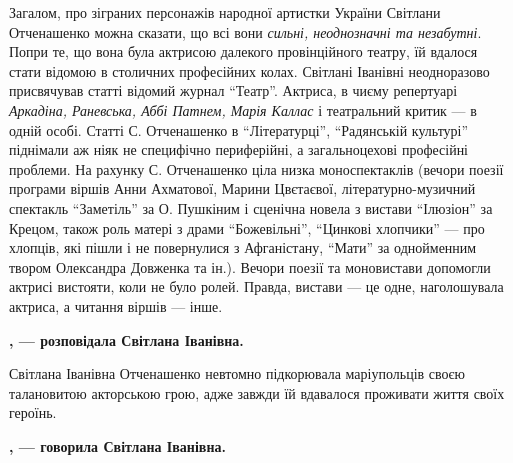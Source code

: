 
Загалом, про зіграних персонажів народної артистки України Світлани Отченашенко
можна сказати, що всі вони \emph{сильні, неоднозначні та незабутні}. Попри те, що вона
була актрисою далекого провінційного театру, їй вдалося стати відомою в
столичних професійних колах. Світлані Іванівні неодноразово присвячував статті
відомий журнал \enquote{Театр}. Актриса, в чиєму репертуарі \emph{Аркадіна, Раневська, Аббі
Патнем, Марія Каллас} і театральний критик — в одній особі. Статті С.
Отченашенко в \enquote{Літературці}, \enquote{Радянській культурі} піднімали аж ніяк не
специфічно периферійні, а загальноцехові професійні проблеми. На рахунку С.
Отченашенко ціла низка моноспектаклів (вечори поезії програми віршів Анни
Ахматової, Марини Цвєтаєвої, літературно-музичний спектакль \enquote{Заметіль} за О.
Пушкіним і сценічна новела з вистави \enquote{Ілюзіон} за Крецом, також роль матері з
драми \enquote{Божевільні}, \enquote{Цинкові хлопчики} — про хлопців, які пішли і не
повернулися з Афганістану, \enquote{Мати} за однойменним твором Олександра Довженка та
ін.). Вечори поезії та моновистави допомогли актрисі вистояти, коли не було
ролей. Правда, вистави — це одне, наголошувала актриса, а читання віршів —
інше. 

\begin{leftbar}
	\begingroup
		\bfseries
{}, — розповідала Світлана Іванівна.
	\endgroup
\end{leftbar}


Світлана Іванівна Отченашенко невтомно підкорювала маріупольців своєю
талановитою акторською грою, адже завжди їй вдавалося проживати життя своїх
героїнь.

\begin{leftbar}
	\begingroup
		\bfseries
{}, — говорила Світлана Іванівна.
	\endgroup
\end{leftbar}

